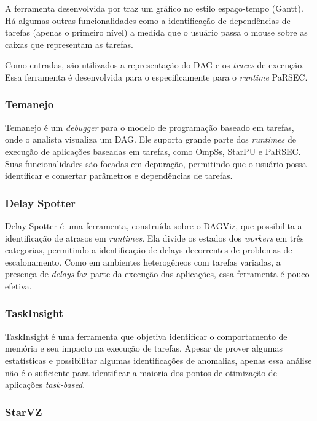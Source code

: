 \documentclass[prop-esp]{iiufrgs}
\begin{document}
A ferramenta desenvolvida por \citet{ref:visuexecdep} traz um gráfico no estilo espaço-tempo (Gantt). Há algumas outras funcionalidades como a identificação de dependências de tarefas (apenas o primeiro nível) a medida que o usuário passa o mouse sobre as caixas que representam as tarefas.

Como entradas, são utilizados a representação do DAG e os \emph{traces} de execução. Essa ferramenta é desenvolvida para o especificamente para o \emph{runtime} PaRSEC.

\subsubsection*{Temanejo}

Temanejo \cite{ref:temanejo} é um \emph{debugger} para o modelo de programação baseado em tarefas, onde o analista visualiza um DAG. Ele suporta grande parte dos 
\emph{runtimes} de execução de aplicações baseadas em tarefas, como OmpSs, StarPU e PaRSEC. Suas funcionalidades são focadas em depuração, permitindo que o usuário possa identificar e consertar parâmetros e dependências de tarefas.

\subsubsection*{Delay Spotter}

Delay Spotter \cite{ref:delayspotter} é uma ferramenta, construída sobre o DAGViz, que possibilita a identificação de atrasos em \emph{runtimes}.
Ela divide os estados dos \emph{workers} em três categorias, permitindo a identificação de delays decorrentes de problemas de escalonamento.
Como em ambientes heterogêneos com tarefas variadas, a presença de \emph{delays} faz parte da execução das aplicações, essa ferramenta é pouco efetiva.

\subsubsection*{TaskInsight}

TaskInsight \cite{ref:taskinsight} é uma ferramenta que objetiva identificar o comportamento de memória e seu impacto na execução de tarefas. 
Apesar de prover algumas estatísticas e possibilitar algumas identificações de anomalias, apenas essa análise não é o suficiente para
identificar a maioria dos pontos de otimização de aplicações \emph{task-based}.

\subsubsection*{StarVZ}
\end{document}
